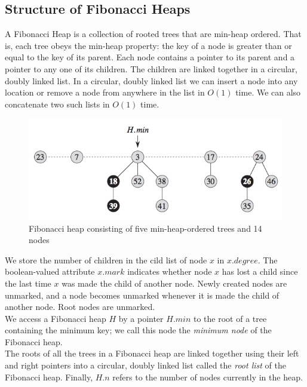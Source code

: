 \subsection{Structure of Fibonacci Heaps}
A Fibonacci Heap is a collection of rooted trees that are min-heap ordered. That is, each tree obeys the min-heap property: the key of a node is greater than or equal to the key of its parent. Each node contains a pointer to its parent and a pointer to any one of its children. The children are linked together in a circular, doubly linked list. In a circular, doubly linked list we can insert a node into any location or remove a node from anywhere in the list in $O(1)$ time. We can also concatenate two such lists in $O(1)$ time.
\begin{figure} [H]
    \begin{center}
        \includegraphics[width=\textwidth]{Images/Hmin.png}
        \caption{Fibonacci heap consisting of five min-heap-ordered trees and 14 nodes}
        \label{fig:H.min}
    \end{center}
\end{figure}

We store the number of children in the cild list of node $x$ in $x.degree$. The boolean-valued attribute $x.mark$ indicates whether node $x$ has lost a child since the last time $x$ was made the child of another node. Newly created nodes are unmarked, and a node becomes unmarked whenever it is made the child of another node. Root nodes are unmarked.\\

We access a Fibonacci heap $H$ by a pointer $H.min$ to the root of a tree containing the minimum key; we call this node the \textit{minimum node} of the Fibonacci heap.\\

The roots of all the trees in a Fibonacci heap are linked together using their left and right pointers into a circular, doubly linked list called the \textit{root list} of the Fibonacci heap. Finally, $H.n$ refers to the number of nodes currently in the heap.
%
